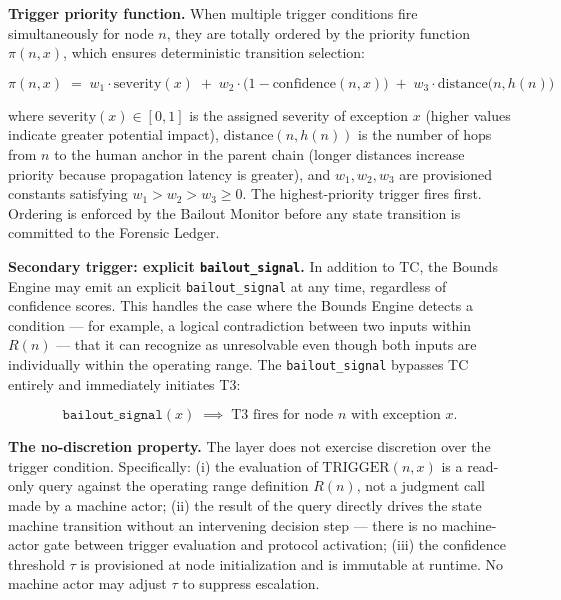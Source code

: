 \medskip\noindent\textbf{Trigger priority function.} When multiple trigger conditions fire simultaneously for node $n$, they are totally ordered by the priority function $\pi(n, x)$, which ensures deterministic transition selection:

\begin{equation}
\pi(n, x) \;=\; w_1 \cdot \text{severity}(x) \;+\; w_2 \cdot \bigl(1 - \text{confidence}(n, x)\bigr) \;+\; w_3 \cdot \text{distance}\bigl(n, h(n)\bigr) \tag{PF}
\end{equation}

where $\text{severity}(x) \in [0, 1]$ is the assigned severity of exception $x$ (higher values indicate greater potential impact), $\text{distance}(n, h(n))$ is the number of hops from $n$ to the human anchor in the parent chain (longer distances increase priority because propagation latency is greater), and $w_1, w_2, w_3$ are provisioned constants satisfying $w_1 > w_2 > w_3 \geq 0$. The highest-priority trigger fires first. Ordering is enforced by the Bailout Monitor before any state transition is committed to the Forensic Ledger.

\medskip\noindent\textbf{Secondary trigger: explicit \texttt{bailout\_signal}.} In addition to TC, the Bounds Engine may emit an explicit \texttt{bailout\_signal} at any time, regardless of confidence scores. This handles the case where the Bounds Engine detects a condition — for example, a logical contradiction between two inputs within $R(n)$ — that it can recognize as unresolvable even though both inputs are individually within the operating range. The \texttt{bailout\_signal} bypasses TC entirely and immediately initiates T3:

\begin{equation}
\texttt{bailout\_signal}(x) \; \implies\; \text{T3 fires for node } n \text{ with exception } x. \tag{TC-secondary}
\end{equation}

\medskip\noindent\textbf{The no-discretion property.} The \bounds{} layer does not exercise discretion over the trigger condition. Specifically: (i) the evaluation of $\text{TRIGGER}(n, x)$ is a read-only query against the operating range definition $R(n)$, not a judgment call made by a machine actor; (ii) the result of the query directly drives the state machine transition without an intervening decision step — there is no machine-actor gate between trigger evaluation and protocol activation; (iii) the confidence threshold $\tau$ is provisioned at node initialization and is immutable at runtime. No machine actor may adjust $\tau$ to suppress escalation.

